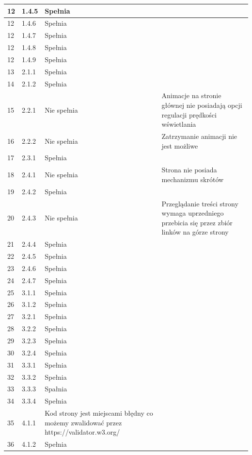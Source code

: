 \documentclass[12pt]{article}
\begin{document}
\begin{longtable}{|p{}|p{}|p{}|p{}|}
        \hline
        12 & 1.4.5 &  Spełnia & \\
        \hline
        12 & 1.4.6 &  Spełnia & \\
        \hline
        12 & 1.4.7 &  Spełnia & \\
        \hline
        12 & 1.4.8 &  Spełnia & \\
        \hline
        12 & 1.4.9 &  Spełnia & \\
        \hline
        13 & 2.1.1 &  Spełnia & \\
        \hline
        14 & 2.1.2 & Spełnia & \\
        \hline
        15 & 2.2.1 &  Nie spełnia & Animacje na stronie głównej nie posiadają opcji regulacji prędkości wświetlania\\
        \hline
        16 & 2.2.2 &  Nie spełnia & Zatrzymanie animacji nie jest możliwe\\
        \hline
        17 & 2.3.1 &  Spełnia & \\
        \hline
        18 & 2.4.1 &  Nie spełnia & Strona nie posiada mechanizmu skrótów\\
        \hline
        19 & 2.4.2 &  Spełnia & \\
        \hline
        20 & 2.4.3 &  Nie spełnia & Przeglądanie treści strony wymaga uprzedniego przebicia się przez zbiór linków na górze strony\\
        \hline
        21 & 2.4.4 &  Spełnia & \\
        \hline
        22 & 2.4.5 &  Spełnia & \\
        \hline
        23 & 2.4.6 &  Spełnia & \\
        \hline
        24 & 2.4.7 &  Spełnia & \\
        \hline
        25 & 3.1.1 &  Spełnia & \\
        \hline
        26 & 3.1.2 &  Spełnia & \\
        \hline
        27 & 3.2.1 &  Spełnia & \\
        \hline
        28 & 3.2.2 &  Spełnia & \\
        \hline
        29 & 3.2.3 &  Spełnia & \\
        \hline
        30 & 3.2.4 &  Spełnia & \\
        \hline
        31 & 3.3.1 &  Spełnia & \\
        \hline
        32 & 3.3.2 &  Spełnia & \\
        \hline
        33 & 3.3.3 &  Spałnia & \\
        \hline
        34 & 3.3.4 &  Spełnia & \\
        \hline
        35 & 4.1.1 &  Kod strony jest miejscami błędny co możemy zwalidować przez https://validator.w3.org/ & \\
        \hline
        36 & 4.1.2 & Spełnia & \\
        \hline
    \end{longtable}
\end{document}

